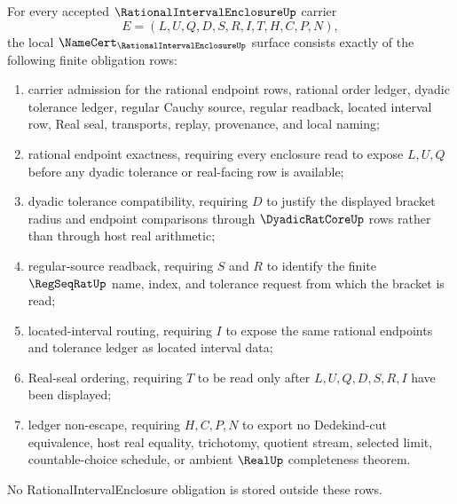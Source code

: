 \begin{theorem}
\label{thm:rational-interval-enclosure-namecert-obligations}
For every accepted $\RationalIntervalEnclosureUp$ carrier
$$
E=(L,U,Q,D,S,R,I,T,H,C,P,N),
$$
the local $\NameCert_{\RationalIntervalEnclosureUp}$ surface consists exactly of the following finite obligation rows:
\begin{enumerate}
\item carrier admission for the rational endpoint rows, rational order ledger, dyadic tolerance ledger, regular Cauchy source, regular readback, located interval row, Real seal, transports, replay, provenance, and local naming;
\item rational endpoint exactness, requiring every enclosure read to expose $L,U,Q$ before any dyadic tolerance or real-facing row is available;
\item dyadic tolerance compatibility, requiring $D$ to justify the displayed bracket radius and endpoint comparisons through $\DyadicRatCoreUp$ rows rather than through host real arithmetic;
\item regular-source readback, requiring $S$ and $R$ to identify the finite $\RegSeqRatUp$ name, index, and tolerance request from which the bracket is read;
\item located-interval routing, requiring $I$ to expose the same rational endpoints and tolerance ledger as located interval data;
\item Real-seal ordering, requiring $T$ to be read only after $L,U,Q,D,S,R,I$ have been displayed;
\item ledger non-escape, requiring $H,C,P,N$ to export no Dedekind-cut equivalence, host real equality, trichotomy, quotient stream, selected limit, countable-choice schedule, or ambient $\RealUp$ completeness theorem.
\end{enumerate}
No RationalIntervalEnclosure obligation is stored outside these rows.
\end{theorem}
